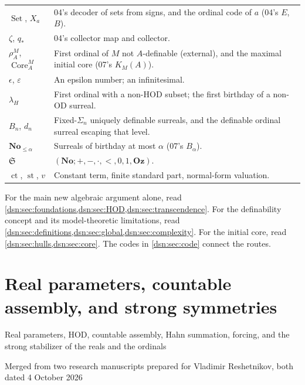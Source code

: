 \documentclass[11pt,a4paper]{article}
\numberwithin{equation}{section}
\theoremstyle{definition}
\theoremstyle{remark}
\newcommand{\No}{\mathbf{No}}
\newcommand{\Oz}{\mathbf{Oz}}
\newcommand{\OD}{\mathrm{OD}}
\newcommand{\HOD}{\mathrm{HOD}}
\newcommand{\ct}{\operatorname{ct}}
\newcommand{\st}{\operatorname{st}}
\newcommand{\SetDec}{\operatorname{Set}}
\newcommand{\Core}{\operatorname{Core}}
\begin{document}
\begin{longtable}{@{}P{0.24\textwidth}P{0.70\textwidth}@{}}
$\SetDec$, $X_a$ & 04's decoder of sets from signs, and the ordinal code of
$a$ (04's $E$, $B$).\\[3pt]
$\zeta$, $q_*$ & 04's collector map and collector.\\[3pt]
$\rho^M_A$, $\Core^M_A$ & First ordinal of $M$ not $A$-definable (external),
and the maximal initial core (07's $K_M(A)$).\\[3pt]
$\epsilon$, $\varepsilon$ & An epsilon number; an infinitesimal.\\[3pt]
$\lambda_H$ & First ordinal with a non-$\HOD$ subset; the first birthday of
a non-$\OD$ surreal.\\[3pt]
$B_n$, $d_n$ & Fixed-$\Sigma_n$ uniquely definable surreals, and the
definable ordinal surreal escaping that level.\\[3pt]
$\No_{\le\alpha}$ & Surreals of birthday at most $\alpha$ (07's
$B_\alpha$).\\[3pt]
$\mathfrak S$ & $(\No;+,-,\cdot,<,0,1,\Oz)$.\\[3pt]
$\ct$, $\st$, $v$ & Constant term, finite standard part, normal-form
valuation.\\
\bottomrule
\end{longtable}

For the main new algebraic argument alone, read
\cref{dsn:sec:foundations,dsn:sec:HOD,dsn:sec:transcendence}. For the
definability concept and its model-theoretic limitations, read
\cref{dsn:sec:definitions,dsn:sec:global,dsn:sec:complexity}. For the
initial core, read \cref{dsn:sec:hulls,dsn:sec:core}. The codes in
\cref{dsn:sec:code} connect the routes.

\clearpage
\part{Real parameters, countable assembly, and strong symmetries}
\label{dsn:part:rp}

\setcounter{section}{18}
\renewcommand{\thesection}{\arabic{section}}
\renewcommand{\theHsection}{rp.\arabic{section}}
\makeatletter\gdef\Hy@chapapp{\Hy@chapterstring}\makeatother
{}

{\large Real parameters, HOD, countable assembly, Hahn summation, forcing, and
the strong stabilizer of the reals and the ordinals\par}
\smallskip
{Merged from two research manuscripts prepared for Vladimir Reshetnikov,
both dated 4 October 2026\par}
\end{document}
